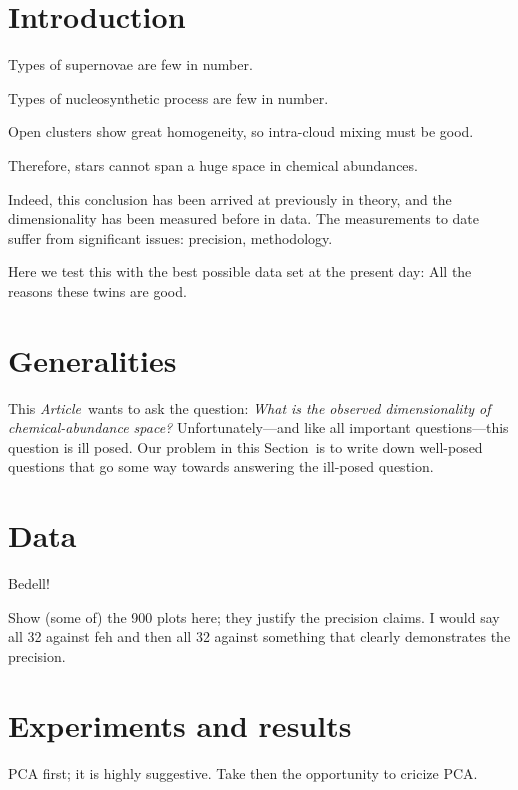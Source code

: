 \documentclass[12pt]{article}
\newcommand{\documentname}{\textsl{Article}}
\newcommand{\sectionname}{Section}
\begin{document}
\sloppy\sloppypar\raggedbottom\frenchspacing

\section{Introduction}

Types of supernovae are few in number.

Types of nucleosynthetic process are few in number.

Open clusters show great homogeneity, so intra-cloud mixing must be good.

Therefore, stars cannot span a huge space in chemical abundances.

Indeed, this conclusion has been arrived at previously in theory, and
the dimensionality has been measured before in data. The measurements to
date suffer from significant issues: precision, methodology.

Here we test this with the best possible data set at the present day:
All the reasons these twins are good.

\section{Generalities}

This \documentname\ wants to ask the question:
\emph{What is the observed dimensionality of chemical-abundance
  space?}
Unfortunately---and like all important questions---this question is
ill posed.
Our problem in this \sectionname\ is to write down well-posed questions
that go some way towards answering the ill-posed question.

\section{Data}

Bedell!

Show (some of) the 900 plots here; they justify the precision claims.
I would say all 32 against feh and then all 32 against something that
clearly demonstrates the precision.

\section{Experiments and results}

PCA first; it is highly suggestive. Take then the opportunity to cricize PCA.
\end{document}
